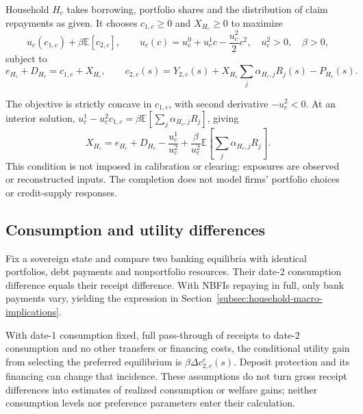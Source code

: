 Household $H_c$ takes borrowing, portfolio shares and the distribution of claim repayments as given. It chooses $c_{1,c}\geq0$ and $X_{H_c}\geq0$ to maximize
\[
 u_c(c_{1,c})+\beta\mathbb E[c_{2,c}],\qquad
 u_c(c)=u_c^0+u_c^1c-\frac{u_c^2}{2}c^2,
 \quad u_c^2>0,\quad\beta>0,
\]
subject to
\[
 e_{H_c}+D_{H_c}=c_{1,c}+X_{H_c},\qquad
 c_{2,c}(s)=Y_{2,c}(s)+X_{H_c}\sum_j\alpha_{H_c,j}R_j(s)-P_{H_c}(s).
\]

The objective is strictly concave in $c_{1,c}$, with second derivative $-u_c^2<0$. At an interior solution, $u_c^1-u_c^2c_{1,c}=\beta\mathbb E[\sum_j\alpha_{H_c,j}R_j]$, giving
\[
 X_{H_c}=e_{H_c}+D_{H_c}-\frac{u_c^1}{u_c^2}
       +\frac{\beta}{u_c^2}\mathbb E\!\left[\sum_j\alpha_{H_c,j}R_j\right].
\]
This condition is not imposed in calibration or clearing: exposures are observed or reconstructed inputs. The completion does not model firms' portfolio choices or credit-supply responses.

\subsection{Consumption and utility differences}

Fix a sovereign state and compare two banking equilibria with identical portfolios, debt payments and nonportfolio resources. Their date-2 consumption difference equals their receipt difference. With NBFIs repaying in full, only bank payments vary, yielding the expression in Section~\ref{subsec:household-macro-implications}.

With date-1 consumption fixed, full pass-through of receipts to date-2 consumption and no other transfers or financing costs, the conditional utility gain from selecting the preferred equilibrium is $\beta\Delta c_{2,c}^e(s)$. Deposit protection and its financing can change that incidence. These assumptions do not turn gross receipt differences into estimates of realized consumption or welfare gains; neither consumption levels nor preference parameters enter their calculation.
